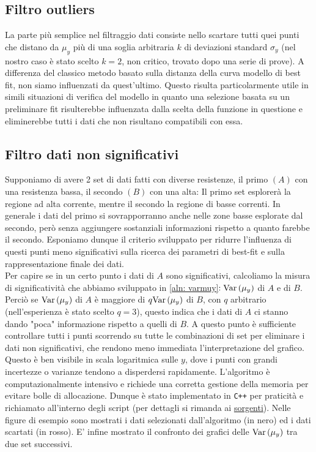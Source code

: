 \documentclass{article}[a4paper, oneside, 11pt]
\begin{document}
\subsection{Filtro outliers}
La parte più semplice nel filtraggio dati consiste nello scartare tutti quei
punti che distano da $\mu_y$ più di una soglia arbitraria $k$ di deviazioni
standard $\sigma_y$ (nel nostro caso è stato scelto $k = 2$, non critico,
trovato dopo una serie di prove). A differenza del classico metodo basato
sulla distanza della curva modello di best fit, non siamo influenzati da
quest’ultimo. Questo risulta particolarmente utile in simili situazioni di
verifica del modello in quanto una selezione basata su un preliminare fit
risulterebbe influenzata dalla scelta della funzione in questione e
eliminerebbe tutti i dati che non risultano compatibili con essa.

\subsection{Filtro dati non significativi}
Supponiamo di avere 2 set di dati fatti con diverse resistenze, il primo $(A)$
con una resistenza bassa, il secondo $(B)$ con una alta: Il primo set esplorerà
la regione ad alta corrente, mentre il secondo la regione di basse correnti.
In generale i dati del primo si sovrapporranno anche nelle zone basse esplorate
dal secondo, però senza aggiungere sostanziali informazioni rispetto a quanto
farebbe il secondo.
Esponiamo dunque il criterio sviluppato per ridurre l'influenza di questi
punti meno significativi sulla ricerca dei parametri di best-fit e sulla
rappresentazione finale dei dati.\\
Per capire se in un certo punto i dati di $A$ sono significativi, calcoliamo
la misura di significatività che abbiamo sviluppato in \eqref{aln: varmuy}$:
\text{Var}\left(\mu_y\right)$ di $A$ e di $B$. Perciò se $\text{Var}\left(\mu_y\right)$ di $A$ è maggiore di 
$q\text{Var}\left(\mu_y\right)$ di $B$, con $q$ arbitrario (nell’esperienza è stato scelto
$q = 3$), questo indica che i dati di $A$
ci stanno dando "poca" informazione rispetto a quelli di $B$. A questo punto
è sufficiente controllare tutti i punti scorrendo su tutte le combinazioni
di set per eliminare i dati non significativi, che rendono meno
immediata l'interpretazione del grafico. Questo è ben visibile in scala
logaritmica sulle $y$, dove i punti con grandi incertezze o varianze tendono
a disperdersi rapidamente.
L’algoritmo è computazionalmente intensivo e richiede una corretta gestione
della memoria per evitare bolle di allocazione. Dunque è stato implementato
in \verb'C++' per praticità e richiamato all’interno degli script (per dettagli si 
rimanda ai 
\href{https://github.com/LucaCiucci/relaz_seme/tree/master/Cartella_fit/filter_src}{sorgenti}).
Nelle figure di esempio sono mostrati i dati selezionati dall’algoritmo
(in nero) ed i dati scartati (in rosso). 
E’ infine mostrato il confronto dei grafici delle $\text{Var}\left(\mu_y\right)$
tra due set successivi.
\end{document}

